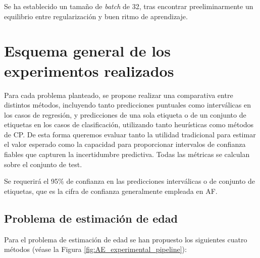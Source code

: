 Se ha establecido un tamaño de \textit{batch} de 32, tras encontrar preeliminarmente un equilibrio entre 
regularización y buen ritmo de aprendizaje.


\section{Esquema general de los experimentos realizados}

Para cada problema planteado, se propone realizar una comparativa entre distintos métodos, incluyendo tanto predicciones puntuales como interválicas en los casos de regresión, y predicciones de una sola etiqueta o de un conjunto de etiquetas en los casos de clasificación, utilizando tanto heurísticas como métodos de \acrshort{CP}. De esta forma queremos evaluar tanto la utilidad tradicional para estimar el valor esperado como la capacidad para proporcionar intervalos de confianza fiables que capturen la incertidumbre predictiva. Todas las métricas se calculan sobre el conjunto de test. 

Se requerirá el 95\% de confianza en las predicciones interválicas o de conjunto de etiquetas, que es la cifra de confianza generalmente empleada en \acrshort{AF}. 

\subsection{Problema de estimación de edad}

Para el problema de estimación de edad se han propuesto los siguientes cuatro métodos (véase la Figura \ref{fig:AE_experimental_pipeline}):

